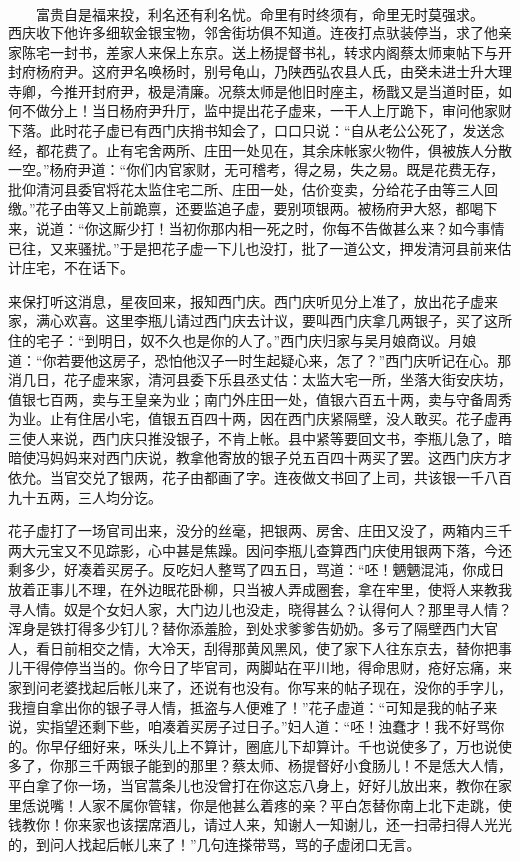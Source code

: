 \[
富贵自是福来投，利名还有利名忧。
命里有时终须有，命里无时莫强求。
\]
西庆收下他许多细软金银宝物，邻舍街坊俱不知道。连夜打点驮装停当，求了他亲家陈宅一封书，差家人来保上东京。送上杨提督书礼，转求内阁蔡太师柬帖下与开封府杨府尹。这府尹名唤杨时，别号龟山，乃陕西弘农县人氏，由癸未进士升大理寺卿，今推开封府尹，极是清廉。况蔡太师是他旧时座主，杨戬又是当道时臣，如何不做分上！当日杨府尹升厅，监中提出花子虚来，一干人上厅跪下，审问他家财下落。此时花子虚已有西门庆捎书知会了，口口只说：“自从老公公死了，发送念经，都花费了。止有宅舍两所、庄田一处见在，其余床帐家火物件，俱被族人分散一空。”杨府尹道：“你们内官家财，无可稽考，得之易，失之易。既是花费无存，批仰清河县委官将花太监住宅二所、庄田一处，估价变卖，分给花子由等三人回缴。”花子由等又上前跪禀，还要监追子虚，要别项银两。被杨府尹大怒，都喝下来，说道：“你这厮少打！当初你那内相一死之时，你每不告做甚么来？如今事情已往，又来骚扰。”于是把花子虚一下儿也没打，批了一道公文，押发清河县前来估计庄宅，不在话下。

来保打听这消息，星夜回来，报知西门庆。西门庆听见分上准了，放出花子虚来家，满心欢喜。这里李瓶儿请过西门庆去计议，要叫西门庆拿几两银子，买了这所住的宅子：“到明日，奴不久也是你的人了。”西门庆归家与吴月娘商议。月娘道：“你若要他这房子，恐怕他汉子一时生起疑心来，怎了？”西门庆听记在心。那消几日，花子虚来家，清河县委下乐县丞丈估：太监大宅一所，坐落大街安庆坊，值银七百两，卖与王皇亲为业；南门外庄田一处，值银六百五十两，卖与守备周秀为业。止有住居小宅，值银五百四十两，因在西门庆紧隔壁，没人敢买。花子虚再三使人来说，西门庆只推没银子，不肯上帐。县中紧等要回文书，李瓶儿急了，暗暗使冯妈妈来对西门庆说，教拿他寄放的银子兑五百四十两买了罢。这西门庆方才依允。当官交兑了银两，花子由都画了字。连夜做文书回了上司，共该银一千八百九十五两，三人均分讫。

花子虚打了一场官司出来，没分的丝毫，把银两、房舍、庄田又没了，两箱内三千两大元宝又不见踪影，心中甚是焦躁。因问李瓶儿查算西门庆使用银两下落，今还剩多少，好凑着买房子。反吃妇人整骂了四五日，骂道：“呸！魉魉混沌，你成日放着正事儿不理，在外边眠花卧柳，只当被人弄成圈套，拿在牢里，使将人来教我寻人情。奴是个女妇人家，大门边儿也没走，晓得甚么？认得何人？那里寻人情？浑身是铁打得多少钉儿？替你添羞脸，到处求爹爹告奶奶。多亏了隔壁西门大官人，看日前相交之情，大冷天，刮得那黄风黑风，使了家下人往东京去，替你把事儿干得停停当当的。你今日了毕官司，两脚站在平川地，得命思财，疮好忘痛，来家到问老婆找起后帐儿来了，还说有也没有。你写来的帖子现在，没你的手字儿，我擅自拿出你的银子寻人情，抵盗与人便难了！”花子虚道：“可知是我的帖子来说，实指望还剩下些，咱凑着买房子过日子。”妇人道：“呸！浊蠢才！我不好骂你的。你早仔细好来，咊头儿上不算计，圈底儿下却算计。千也说使多了，万也说使多了，你那三千两银子能到的那里？蔡太师、杨提督好小食肠儿！不是恁大人情，平白拿了你一场，当官蒿条儿也没曾打在你这忘八身上，好好儿放出来，教你在家里恁说嘴！人家不属你管辖，你是他甚么着疼的亲？平白怎替你南上北下走跳，使钱教你！你来家也该摆席酒儿，请过人来，知谢人一知谢儿，还一扫帚扫得人光光的，到问人找起后帐儿来了！”几句连搽带骂，骂的子虚闭口无言。

